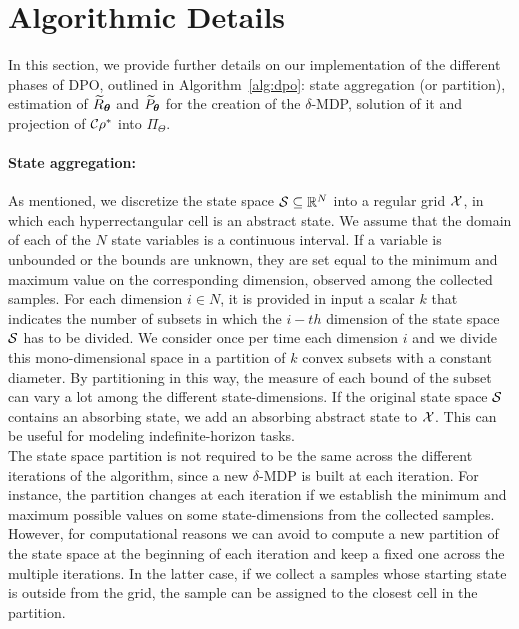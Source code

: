 \section{Algorithmic Details}\label{sec:detail}
In this section, we provide further details on our implementation of the different phases of \ac{DPO}, outlined in Algorithm~\ref{alg:dpo}: state aggregation (or partition), estimation of $\widetilde{R}_{\boldsymbol{\theta}}$ and $\widetilde{P}_{\boldsymbol{\theta}}$ for the creation of the $\delta$-\ac{MDP}, solution of it and projection of $\mathcal{C}\rho^{*}$ into $\Pi_{\Theta}$.

\paragraph{State aggregation:}
As mentioned, we discretize the state space $\mathcal{S}\subseteq\mathbb{R}^N$ into a regular grid $\mathcal{X}$, in which each hyperrectangular cell is an abstract state. 
We assume that the domain of each of the $N$ state variables is a continuous interval. If a variable is unbounded or the bounds are unknown, they are set equal to the minimum and maximum value on the corresponding dimension, observed among the collected samples. 
For each dimension $i \in N$, it is provided in input a scalar $k$ that indicates the number of subsets in which the $i-th$ dimension of the state space $\mathcal{S}$ has to be divided. We consider once per time each dimension $i$ and we divide this mono-dimensional space in a partition of $k$ convex subsets with a constant diameter. By partitioning in this way, the measure of each bound of the subset can vary a lot among the different state-dimensions. 
If the original state space $\mathcal{S}$ contains an absorbing state, we add an absorbing abstract state to $\mathcal{X}$. This can be useful for modeling indefinite-horizon tasks.\\
\newline
The state space partition is not required to be the same across the different iterations of the algorithm, since a new $\delta$-MDP is built at each iteration. For instance, the partition changes at each iteration if we establish the minimum and maximum possible values on some state-dimensions from the collected samples. However, for computational reasons we can avoid to compute a new partition of the state space at the beginning of each iteration and keep a fixed one across the multiple iterations. In the latter case, if we collect a samples whose starting state is outside from the grid, the sample can be assigned to the closest cell in the partition.
